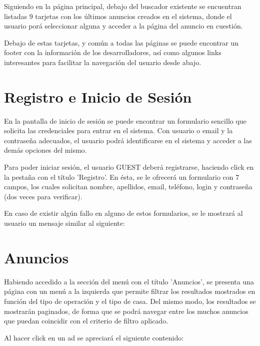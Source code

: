 
Siguiendo en la p\'{a}gina principal, debajo del buscador existente se encuentran listadas 9 tarjetas con los \'{u}ltimos anuncios creados en el sistema, donde el usuario por\'{a} seleccionar alguna y acceder a la p\'{a}gina del anuncio en cuesti\'{o}n.



Debajo de estas tarjetas, y com\'{u}n a todas las p\'{a}ginas se puede encontrar un footer con la informaci\'{o}n de los desarrolladores, as\'{i} como algunos links interesantes para facilitar la navegaci\'{o}n del usuario desde abajo.


\section{Registro e Inicio de Sesi\'{o}n}
En la pantalla de inicio de sesi\'{o}n se puede encontrar un formulario sencillo que solicita las credenciales para entrar en el sistema. Con usuario o email y la contrase\~{n}a adecuados, el usuario podr\'{a} identificarse en el sistema y acceder a las dem\'{a}s opciones del mismo.




Para poder iniciar sesi\'{o}n, el usuario GUEST deber\'{a} registrarse, haciendo click en la pesta\~{n}a con el t\'{i}tulo 'Registro'. En \'{e}sta, se le ofrecer\'{a} un formulario con 7 campos, los cuales solicitan nombre, apellidos, email, tel\'{e}fono, login y contrase\~{n}a (dos veces para verificar).


En caso de existir alg\'{u}n fallo en alguno de estos formularios, se le mostrar\'{a} al usuario un mensaje similar al siguiente:



\section{Anuncios}
Habiendo accedido a la secci\'{o}n del men\'{u} con el t\'{i}tulo 'Anuncios', se presenta una p\'{a}gina con un men\'{u} a la izquierda que permite filtrar los resultados mostrados en funci\'{o}n del tipo de operaci\'{o}n y el tipo de casa. Del mismo modo, los resultados se mostrar\'{a}n paginados, de forma que se podr\'{a} navegar entre los muchos anuncios que puedan coincidir con el criterio de filtro aplicado.



Al hacer click en un ad se apreciar\'{a} el siguiente contenido:


